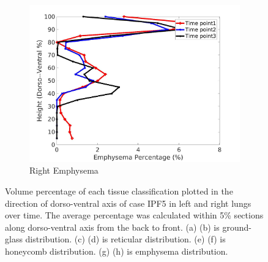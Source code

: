 \begin{figure}[H]
\begin{subfigure}{.42\linewidth}
  \includegraphics[width=\linewidth,trim={{.0\wd0} {.0\wd0} {.0\wd0} {.0\wd0}},clip]{Appendix/Image_AppexA/DorsoToVentral/IPF5RightLungEmphysemaDiseaseDorsoToVentral.jpg}
  \caption{Right Emphysema}
  \label{fig:IPF5DiseaseDorsoToVentral-h}
\end{subfigure}
\caption{Volume percentage of each tissue classification plotted in the direction of dorso-ventral axis of case IPF5 in left and right lungs over time. The average percentage was calculated within 5\% sections along dorso-ventral axis from the back to front. (a) (b) is ground-glass distribution. (c) (d) is reticular distribution. (e) (f) is honeycomb distribution. (g) (h) is emphysema distribution.}
\label{fig:IPF5DiseaseDorsoToVentral}
\end{figure}

